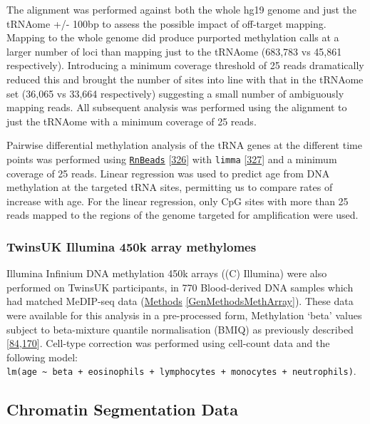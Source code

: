 \documentclass[
]{book}
\begin{document}
The alignment was performed against both the whole hg19 genome and just the tRNAome +/- 100bp to assess the possible impact of off-target mapping.
Mapping to the whole genome did produce purported methylation calls at a larger number of loci than mapping just to the tRNAome (683,783 vs 45,861 respectively).
Introducing a minimum coverage threshold of 25 reads dramatically reduced this and brought the number of sites into line with that in the tRNAome set (36,065 vs 33,664 respectively) suggesting a small number of ambiguously mapping reads.
All subsequent analysis was performed using the alignment to just the tRNAome with a minimum coverage of 25 reads.

Pairwise differential methylation analysis of the tRNA genes at the different time points was performed using \href{https://bioconductor.org/packages/release/bioc/html/RnBeads.html}{\texttt{RnBeads}} {[}\protect\hyperlink{ref-Muller2019}{326}{]} with \texttt{limma} {[}\protect\hyperlink{ref-Ritchie2015}{327}{]} and a minimum coverage of 25 reads.
Linear regression was used to predict age from DNA methylation at the targeted tRNA sites, permitting us to compare rates of increase with age.
For the linear regression, only CpG sites with more than 25 reads mapped to the regions of the genome targeted for amplification were used.

\hypertarget{twinsuk-illumina-450k-array-methylomes}{%
\subsubsection{TwinsUK Illumina 450k array methylomes}\label{twinsuk-illumina-450k-array-methylomes}}

Illumina Infinium DNA methylation 450k arrays ((C) Illumina) were also performed on TwinsUK participants, in 770 Blood-derived DNA samples which had matched MeDIP-seq data (\protect\hyperlink{GenMethodsMethArray}{Methods} \ref{GenMethodsMethArray}).
These data were available for this analysis in a pre-processed form, Methylation `beta' values subject to beta-mixture quantile normalisation (BMIQ) as previously described {[}\protect\hyperlink{ref-Bell2017a}{84},\protect\hyperlink{ref-Bell2016}{170}{]}.
Cell-type correction was performed using cell-count data and the following model: \texttt{lm(age\ \textasciitilde{}\ beta\ +\ eosinophils\ +\ lymphocytes\ +\ monocytes\ +\ neutrophils)}.

\hypertarget{chromatin-segmentation-data}{%
\subsection{Chromatin Segmentation Data}\label{chromatin-segmentation-data}}
\end{document}

